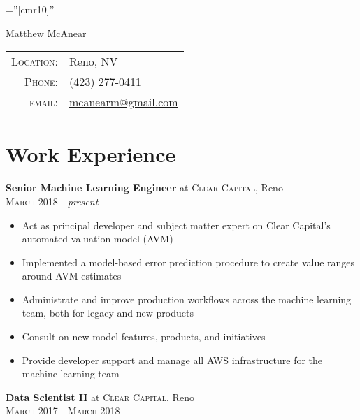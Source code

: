 \documentclass[a4paper,10pt]{article}
\begin{document}
\pagestyle{empty} %

\font\fb=''[cmr10]'' %

\par{\centering
		{\Huge Matthew McAnear
	}\bigskip\par}

\begin{tabular}{rl}
    \textsc{Location:}  & Reno, NV\\
    \textsc{Phone:}     & (423) 277-0411\\
    \textsc{email:}     & \href{mailto:mcanearm@gmail.com}{mcanearm@gmail.com}
\end{tabular}


\vspace{5mm}

\section{Work Experience}

\textbf{Senior Machine Learning Engineer} at \textsc{Clear Capital}, Reno \\
\textsc{March 2018} - \emph{present} \\
\small
\vspace{-5mm}
\begin{itemize}
    \item Act as principal developer and subject matter expert on Clear Capital's automated valuation model (AVM)
    \item Implemented a model-based error prediction procedure to create value ranges around AVM estimates
    \item Administrate and improve production workflows across the machine learning team, both for legacy and new products
    \item Consult on new model features, products, and initiatives
    \item Provide developer support and manage all AWS infrastructure for the machine learning team
\end{itemize}

\normalsize
\textbf{Data Scientist II} at \textsc{Clear Capital}, Reno \\
\textsc{March 2017} - \textsc{March 2018} \\
\end{document}
